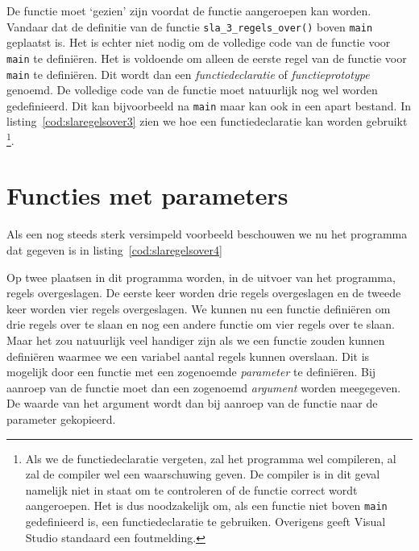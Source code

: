 De functie moet `gezien' zijn voordat de functie aangeroepen kan worden.
Vandaar dat de definitie van de functie \texttt{sla\_3\_regels\_over()} boven \texttt{main} geplaatst is.
Het is echter niet nodig om de volledige code van de functie voor \texttt{main} te definiëren.
Het is voldoende om alleen de eerste regel van de functie voor \texttt{main} te definiëren.
Dit wordt dan een \textsl{functiedeclaratie} of \textsl{functieprototype} genoemd.
De volledige code van de functie moet natuurlijk nog wel worden gedefinieerd.
Dit kan bijvoorbeeld na \texttt{main} maar kan ook in een apart bestand.
In listing~\ref{cod:slaregelsover3} zien we hoe een functiedeclaratie kan worden gebruikt
\footnote{Als we de functiedeclaratie vergeten, zal het programma wel compileren, al zal de compiler wel een waarschuwing geven. De compiler is in dit geval namelijk niet in staat om te controleren of de functie correct wordt aangeroepen.  Het is dus noodzakelijk om, als een functie niet boven \texttt{main} gedefinieerd is, een functiedeclaratie te gebruiken. Overigens geeft Visual Studio standaard een foutmelding.}.



\section{Functies met parameters} 
Als een nog steeds sterk versimpeld voorbeeld beschouwen we nu het programma dat gegeven is in listing~\ref{cod:slaregelsover4}


Op twee plaatsen in dit programma worden, in de uitvoer van het programma, regels overgeslagen.
De eerste keer worden drie regels overgeslagen en de tweede keer worden vier regels overgeslagen.
We kunnen nu een functie definiëren om drie regels over te slaan en nog een andere functie om vier regels over te slaan.
Maar het zou natuurlijk veel handiger zijn als we een functie zouden kunnen definiëren waarmee we een variabel aantal regels kunnen overslaan.
Dit is mogelijk door een functie met een zogenoemde \textsl{parameter} te definiëren.
Bij aanroep van de functie moet dan een zogenoemd \textsl{argument} worden meegegeven.
De waarde van het argument wordt dan bij aanroep van de functie naar de parameter gekopieerd.


